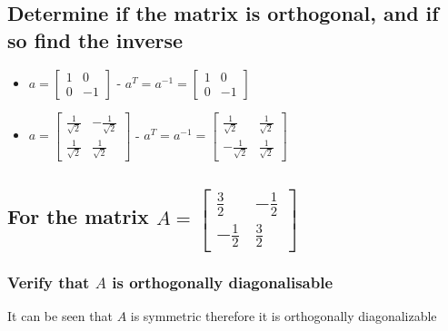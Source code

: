 \documentclass[12pt, a4paper]{article}
\begin{document}
		\subsection{Determine if the matrix is orthogonal, and if so find the inverse}
			\begin{itemize}
				\item $a= \begin{bmatrix}1&0\\0&-1\end{bmatrix}$ - $a^T=a^{-1}=\begin{bmatrix}1&0\\0&-1\end{bmatrix}$
				\item $a=\begin{bmatrix}\frac{1}{\sqrt{2}} & -\frac{1}{\sqrt{2}}\\\frac{1}{\sqrt{2}}&\frac{1}{\sqrt{2}}\end{bmatrix}$ -  $a^T=a^{-1}=\begin{bmatrix}\frac{1}{\sqrt{2}} & \frac{1}{\sqrt{2}}\\-\frac{1}{\sqrt{2}}&\frac{1}{\sqrt{2}}\end{bmatrix}$
			\end{itemize}
		\subsection{For the matrix $A=\begin{bmatrix}\frac{3}{2}&-\frac{1}{2}\\-\frac{1}{2}&\frac{3}{2}\end{bmatrix}$}
			\subsubsection{Verify that $A$ is orthogonally diagonalisable}
				It can be seen that $A$ is symmetric therefore it is orthogonally diagonalizable
\end{document}
